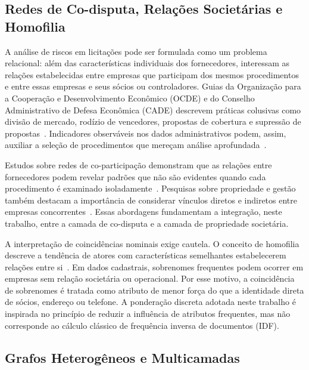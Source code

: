 \subsection{Redes de Co-disputa, Relações Societárias e Homofilia}

A análise de riscos em licitações pode ser formulada como um problema relacional: além das características individuais dos fornecedores, interessam as relações estabelecidas entre empresas que participam dos mesmos procedimentos e entre essas empresas e seus sócios ou controladores. Guias da Organização para a Cooperação e Desenvolvimento Econômico (OCDE) e do Conselho Administrativo de Defesa Econômica (CADE) descrevem práticas colusivas como divisão de mercado, rodízio de vencedores, propostas de cobertura e supressão de propostas~\cite{oecd2025guidelines,cade2019guia}. Indicadores observáveis nos dados administrativos podem, assim, auxiliar a seleção de procedimentos que mereçam análise aprofundada~\cite{carbone2024bidrigging,fazekas2016objective,wachs2020corruption}.

Estudos sobre redes de co-participação demonstram que as relações entre fornecedores podem revelar padrões que não são evidentes quando cada procedimento é examinado isoladamente~\cite{wachs2019cartel,lyra2021characterization}. Pesquisas sobre propriedade e gestão também destacam a importância de considerar vínculos diretos e indiretos entre empresas concorrentes~\cite{villamil2024collusion,pompeu2025collusion}. Essas abordagens fundamentam a integração, neste trabalho, entre a camada de co-disputa e a camada de propriedade societária.

A interpretação de coincidências nominais exige cautela. O conceito de homofilia descreve a tendência de atores com características semelhantes estabelecerem relações entre si~\cite{mcpherson2001homophily}. Em dados cadastrais, sobrenomes frequentes podem ocorrer em empresas sem relação societária ou operacional. Por esse motivo, a coincidência de sobrenomes é tratada como atributo de menor força do que a identidade direta de sócios, endereço ou telefone. A ponderação discreta adotada neste trabalho é inspirada no princípio de reduzir a influência de atributos frequentes, mas não corresponde ao cálculo clássico de frequência inversa de documentos (IDF).

\subsection{Grafos Heterogêneos e Multicamadas}

